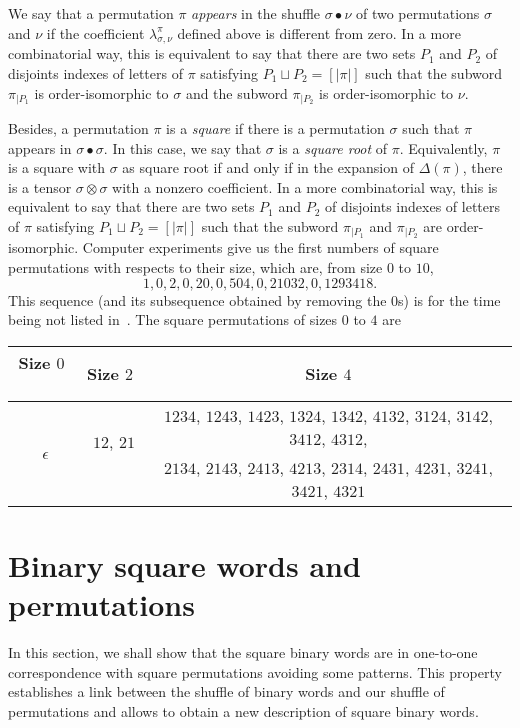 \documentclass[a4paper]{llncs}
\DeclareMathOperator{\SHUFFLE}{\bullet}
\begin{document}
We say that a permutation $\pi$ \emph{appears} in the shuffle
$\sigma \SHUFFLE \nu$ of two permutations $\sigma$ and $\nu$ if the
coefficient $\lambda_{\sigma, \nu}^\pi$ defined above is different from
zero. In a more combinatorial way, this is equivalent to say that there
are two sets $P_1$ and $P_2$ of disjoints indexes of letters of $\pi$
satisfying $P_1 \sqcup P_2 = [|\pi|]$ such that the subword $\pi_{|P_1}$
is order-isomorphic to $\sigma$ and the subword $\pi_{|P_2}$ is
order-isomorphic to $\nu$.
\medskip

Besides, a permutation $\pi$ is a \emph{square} if there is a
permutation $\sigma$ such that $\pi$ appears in $\sigma \SHUFFLE \sigma$.
In this case, we say that $\sigma$ is a \emph{square root} of $\pi$.
Equivalently, $\pi$ is a square with $\sigma$ as square root if and only
if in the expansion of $\Delta(\pi)$, there is a tensor
$\sigma \otimes \sigma$ with a nonzero coefficient. In a more
combinatorial way, this is equivalent to say that there are two sets
$P_1$ and $P_2$ of disjoints indexes of letters of $\pi$ satisfying
$P_1 \sqcup P_2 = [|\pi|]$ such that the subword $\pi_{|P_1}$ and
$\pi_{|P_2}$ are order-isomorphic. Computer experiments give us the
first numbers of square permutations with respects to their size, which
are, from size $0$ to $10$,
\begin{equation}
    1, 0, 2, 0, 20, 0, 504, 0, 21032, 0, 1293418.
\end{equation}
This sequence (and its subsequence obtained by removing the $0$s) is for
the time being not listed in~\cite{Slo}. The square permutations of
sizes $0$ to $4$ are
\smallskip

\begin{tabular}{c|c|c}
    Size $0$ \, & Size $2$ & Size $4$ \\ \hline
    \multirow{2}{*}{\, $\epsilon$} &
    \multirow{2}{*}{\, $12$, $21$ \,} &
    $1234$, $1243$, $1423$, $1324$, $1342$, $4132$, $3124$, $3142$,
    $3412$, $4312$, \\
    & & $2134$, $2143$, $2413$, $4213$, $2314$, $2431$, $4231$, $3241$,
    $3421$, $4321$
\end{tabular}
\medskip


\section{Binary square words and permutations}
\label{section:Binary square words and permutations}
In this section, we shall show that the square binary words are in
one-to-one correspondence with square permutations avoiding some
patterns. This property establishes a link between the shuffle of binary
words and our shuffle of permutations and allows to obtain a new
description of square binary words.
\medskip
\end{document}
